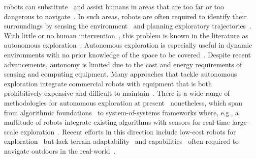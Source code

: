 \documentclass[lettersize,journal]{IEEEtran}
\theoremstyle{definition}
\begin{document}
 robots can %
substitute~\cite{rubio2019review} and %
assist humans in %
areas that are too far or too dangerous to navigate~\cite{takahiro2022legged,roucek2020darpa,tabib2022autonomous,ebadi2020lamp}. In %
such areas, robots are often required to identify their surroundings by sensing the environment~\cite{mei2006energy} and planning %
exploratory trajectories~\cite{shrestha2019learned,eldemiry2022autonomous}. With little or no human intervention~\cite{alatise2020review}, this problem is known in the literature as autonomous exploration~\cite{shrestha2019learned}. 
Autonomous exploration is especially useful in dynamic environments with no prior knowledge of the space to be covered~\cite{bircher2016receding,rubio2019review}.
Despite recent advancements, autonomy is limited %
due to the cost and energy requirements of sensing and computing equipment. %
Many approaches that tackle autonomous exploration 
integrate commercial robots with %
equipment that is both prohibitively expensive and difficult to maintain~\cite{lluvia2021active,placed2022survey,muller2021openbot,tabib2022autonomous,tardioli2019ground,ebadi2020lamp,dang2019graph,surmann2003autonomous}. 
There is a wide range of methodologies for autonomous exploration at present~\cite{placed2022survey,julia2012comparison} nonetheless, which span from algorithmic foundations~\cite{yamauchi1997frontier,placed2022survey,dang2019graph} to system-of-systems frameworks where, e.g., a multitude of robots integrate existing algorithms with sensors for real-time large-scale exploration~\cite{tranzatto2022cerberus,roucek2020darpa,tardioli2019ground,tabib2022autonomous,ebadi2020lamp}. 
Recent efforts in this direction include low-cost robots for exploration~\cite{muller2021openbot, zhou2021smartphone,faisal2021low} but lack terrain adaptability~\cite{muller2021openbot} and %
capabilities~\cite{zhou2021smartphone,faisal2021low} often required to navigate outdoors in the real-world~\cite{rubio2019review,kulkarni2022autonomous}.
\end{document}
